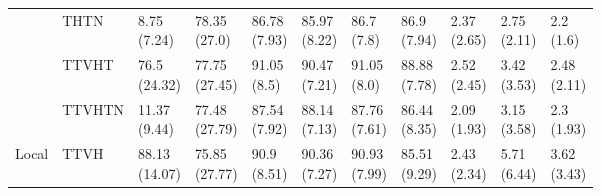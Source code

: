 \begin{table}
\begin{tabular}{lllllllllll}
       & THTN &    \makecell{8.75\\(7.24)} &   \makecell{78.35\\(27.0)} &   \makecell{86.78\\(7.93)} &  \makecell{85.97\\(8.22)} &    \makecell{86.7\\(7.8)} &    \makecell{86.9\\(7.94)} &      \makecell{2.37\\(2.65)} &  \makecell{2.75\\(2.11)} &    \makecell{2.2\\(1.6)} \\
       & TTVHT &   \makecell{76.5\\(24.32)} &  \makecell{77.75\\(27.45)} &    \makecell{91.05\\(8.5)} &  \makecell{90.47\\(7.21)} &   \makecell{91.05\\(8.0)} &   \makecell{88.88\\(7.78)} &      \makecell{2.52\\(2.45)} &  \makecell{3.42\\(3.53)} &  \makecell{2.48\\(2.11)} \\
       & TTVHTN &   \makecell{11.37\\(9.44)} &  \makecell{77.48\\(27.79)} &   \makecell{87.54\\(7.92)} &  \makecell{88.14\\(7.13)} &  \makecell{87.76\\(7.61)} &   \makecell{86.44\\(8.35)} &      \makecell{2.09\\(1.93)} &  \makecell{3.15\\(3.58)} &   \makecell{2.3\\(1.93)} \\
Local & TTVH &  \makecell{88.13\\(14.07)} &  \makecell{75.85\\(27.77)} &    \makecell{90.9\\(8.51)} &  \makecell{90.36\\(7.27)} &  \makecell{90.93\\(7.99)} &   \makecell{85.51\\(9.29)} &      \makecell{2.43\\(2.34)} &  \makecell{5.71\\(6.44)} &  \makecell{3.62\\(3.43)} \\

\end{tabular}
\end{table}
